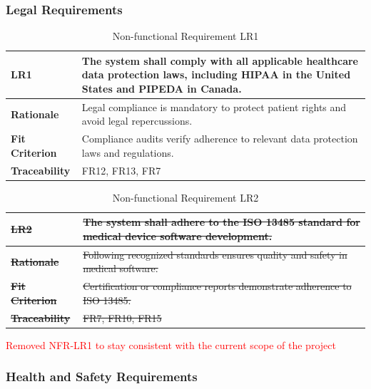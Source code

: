 \documentclass[12pt]{article}
\begin{document}
\subsubsection{Legal Requirements}

\begin{table}[h!]
\centering
{}
\begin{tabular}{|p{3.5cm}|p{11.5cm}|}
\hline
\rowcolor{gray!30}
\textbf{LR1} & The system shall comply with all applicable healthcare data protection laws, including HIPAA in the United States and PIPEDA in Canada. \\
\hline
\textbf{Rationale} & Legal compliance is mandatory to protect patient rights and avoid legal repercussions. \\
\hline
\textbf{Fit Criterion} & Compliance audits verify adherence to relevant data protection laws and regulations. \\
\hline
\textbf{Traceability} & FR12, FR13, FR7 \\
\hline
\end{tabular}
\caption{Non-functional Requirement LR1}
\end{table}

\begin{table}[h!]
\centering
{}
\begin{tabular}{|p{3.5cm}|p{11.5cm}|}
\hline
\rowcolor{gray!30}
\sout{\textbf{LR2}} & \sout{The system shall adhere to the ISO 13485 standard for medical device software development.} \\
\hline
\sout{\textbf{Rationale}} & \sout{Following recognized standards ensures quality and safety in medical software.} \\
\hline
\sout{\textbf{Fit Criterion}} & \sout{Certification or compliance reports demonstrate adherence to ISO 13485.} \\
\hline
\sout{\textbf{Traceability}} & \sout{FR7, FR10, FR15} \\
\hline
\end{tabular}
\caption{Non-functional Requirement LR2}
\textcolor{red}{Removed NFR-LR1 to stay consistent with the current scope of the project}
\end{table}
\newpage
\subsubsection{Health and Safety Requirements}
\end{document}
